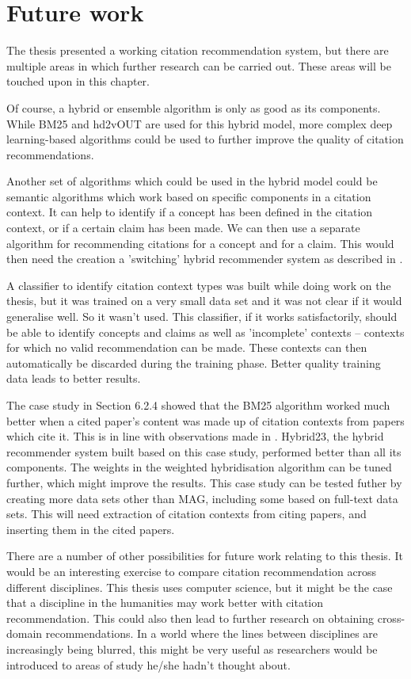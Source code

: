\chapter{Future work}

The thesis presented a working citation recommendation system, but there are multiple areas in which further research can be carried out. These areas will be touched upon in this chapter. 

Of course, a hybrid or ensemble algorithm is only as good as its components. While BM25 and hd2vOUT are used for this hybrid model, more complex deep learning-based algorithms could be used to further improve the quality of citation recommendations. 

Another set of algorithms which could be used in the hybrid model could be semantic algorithms which work based on specific components in a citation context. It can help to identify if a concept has been defined in the citation context, or if a certain claim has been made. We can then use a separate algorithm for recommending citations for a concept and for a claim. This would then need the creation a 'switching' hybrid recommender system as described in \cite{Burke2002}. 

A classifier to identify citation context types was built while doing work on the thesis, but it was trained on a very small data set and it was not clear if it would generalise well. So it wasn't used. This classifier, if it works satisfactorily, should be able to identify concepts and claims as well as 'incomplete' contexts -- contexts for which no valid recommendation can be made. These contexts can then automatically be discarded during the training phase. Better quality training data leads to better results. 

The case study in Section 6.2.4 showed that the BM25 algorithm worked much better when a cited paper's content was made up of citation contexts from papers which cite it. This is in line with observations made in \cite{HuangKCMGR12}. 
Hybrid23, the hybrid recommender system built based on this case study, performed better than all its components. The weights in the weighted hybridisation algorithm can be tuned further, which might improve the results. 
This case study can be tested futher by creating more data sets other than MAG, including some based on full-text data sets. This will need extraction of citation contexts from citing papers, and inserting them in the cited papers. 

There are a number of other possibilities for future work relating to this thesis. It would be an interesting exercise to compare citation recommendation across different disciplines. This thesis uses computer science, but it might be the case that a discipline in the humanities may work better with citation recommendation.
This could also then lead to further research on obtaining cross-domain recommendations. In a world where the lines between disciplines are increasingly being blurred, this might be very useful as researchers would be introduced to areas of study he/she hadn't thought about. 

